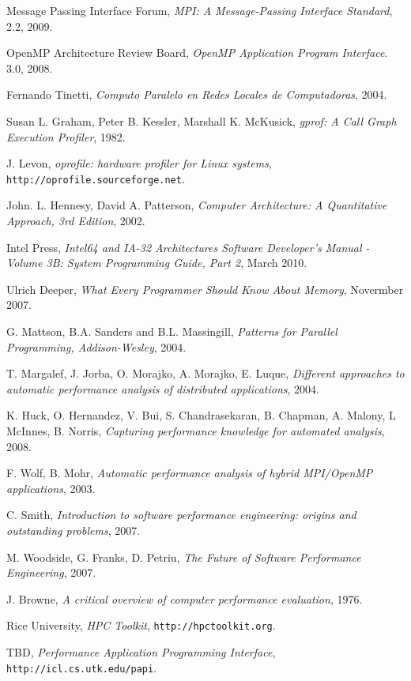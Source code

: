 \documentclass[a4paper,twocolumn]{article}
\begin{document}
\begin{thebibliography}{9}
  
  Message Passing Interface Forum,
  \emph{MPI: A Message-Passing Interface Standard},
  2.2,
  2009.

  OpenMP Architecture Review Board,
  \emph{OpenMP Application Program Interface}.
  3.0,
  2008.

  Fernando Tinetti,
  \emph{Computo Paralelo en Redes Locales de Computadoras},
  2004.

 Susan L. Graham,  Peter B. Kessler,  Marshall K. McKusick,
 \emph{gprof: A Call Graph Execution Profiler},
 1982.

J. Levon,
\emph{oprofile: hardware profiler for Linux systems},
{\tt http://oprofile.sourceforge.net}.

 John. L. Hennesy, David A. Patterson,
 \emph{Computer Architecture: A Quantitative Approach, 3rd Edition},
 2002.

 Intel Press,
 \emph{Intel64 and IA-32 Architectures Software Developer's Manual - Volume 3B: System Programming Guide, Part 2},
 March 2010.

 Ulrich Deeper,
 \emph{What Every Programmer Should Know About Memory},
 Novermber 2007.

 G. Mattson, B.A. Sanders and B.L. Massingill, 
 \emph{Patterns for Parallel Programming, Addison-Wesley},
 2004.

 T. Margalef, J. Jorba, O. Morajko, A. Morajko, E. Luque,
 \emph{Different approaches to automatic performance analysis of distributed applications},
 2004.

 K. Huck, O. Hernandez, V. Bui, S. Chandrasekaran, B. Chapman, A. Malony, L McInnes, B. Norris,
 \emph{Capturing performance knowledge for automated analysis},
 2008.

 F. Wolf, B. Mohr,
 \emph{Automatic performance analysis of hybrid MPI/OpenMP applications},
 2003.

 C. Smith,
 \emph{Introduction to software performance engineering: origins and outstanding problems},
 2007.

 M. Woodside, G. Franks, D. Petriu,
 \emph{The Future of Software Performance Engineering},
 2007.

 J. Browne,
 \emph{A critical overview of computer performance evaluation},
 1976.

  Rice University,
 \emph{HPC Toolkit},
 {\tt http://hpctoolkit.org}.

  TBD,
  \emph{Performance Application Programming Interface},
  {\tt http://icl.cs.utk.edu/papi}.


\end{thebibliography}
\end{document}
